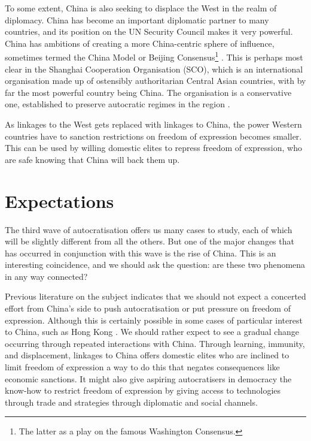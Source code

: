 To some extent, China is also seeking to displace the West in the realm of diplomacy. China has become an important diplomatic partner to many countries, and its position on the UN Security Council makes it very powerful. China has ambitions of creating a more China-centric sphere of influence, sometimes termed the China Model or Beijing Consensus\footnote{The latter as a play on the famous Washington Consensus.} \citep{ambrosio_rise_2012, economy_exporting_2020}. This is perhaps most clear in the Shanghai Cooperation Organisation (SCO), which is an international organisation made up of ostensibly authoritarian Central Asian countries, with by far the most powerful country being China. The organisation is a conservative one, established to preserve autocratic regimes in the region \citep[p. 1322]{ambrosio_catching_2008}.

As linkages to the West gets replaced with linkages to China, the power Western countries have to sanction restrictions on freedom of expression becomes smaller. This can be used by willing domestic elites to repress freedom of expression, who are safe knowing that China will back them up.

\section{Expectations} \label{sec:hypotheses}
The third wave of autocratisation offers us many cases to study, each of which will be slightly different from all the others. But one of the major changes that has occurred in conjunction with this wave is the rise of China. This is an interesting coincidence, and we should ask the question: are these two phenomena in any way connected?

Previous literature on the subject indicates that we should not expect a concerted effort from China's side to push autocratisation or put pressure on freedom of expression. Although this is certainly possible in some cases of particular interest to China, such as Hong Kong \citep{chen_democracy_2015}. We should rather expect to see a gradual change occurring through repeated interactions with China. Through learning, immunity, and displacement, linkages to China offers domestic elites who are inclined to limit freedom of expression a way to do this that negates consequences like economic sanctions. It might also give aspiring autocratisers in democracy the know-how to restrict freedom of expression by giving access to technologies through trade and strategies through diplomatic and social channels. 

